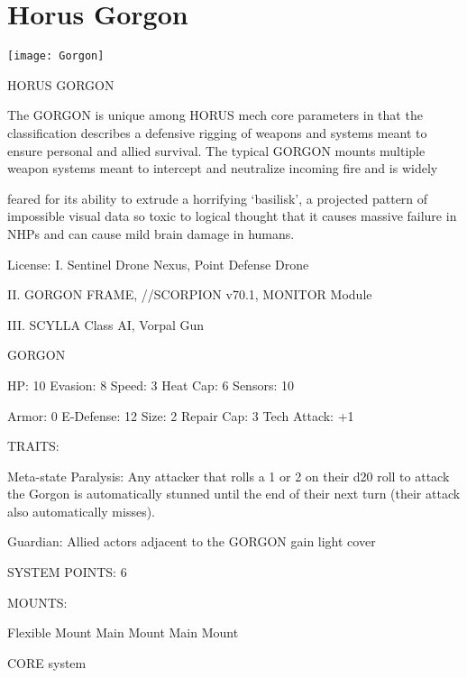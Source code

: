 \section{Horus Gorgon}

\texttt{[image: Gorgon]}

                                              HORUS GORGON

The GORGON is unique among HORUS mech core parameters in that the classification describes a
defensive rigging of weapons and systems meant to ensure personal and allied survival. The typical
GORGON mounts multiple weapon systems meant to intercept and neutralize incoming fire and is widely

feared for its ability to extrude a horrifying ‘basilisk’, a projected pattern of impossible visual data so toxic to
logical thought that it causes massive failure in NHPs and can cause mild brain damage in humans.




                                                   License:
I. Sentinel Drone Nexus, Point Defense Drone

II. GORGON FRAME,  //SCORPION v70.1, MONITOR Module

III. SCYLLA Class AI, Vorpal Gun


                                                 GORGON

 HP: 10         Evasion: 8                            Speed: 3            Heat Cap: 6        Sensors: 10

 Armor: 0       E-Defense: 12                         Size: 2             Repair Cap: 3      Tech Attack:
                                                                                             +1

                                                   TRAITS:

 Meta-state Paralysis: Any attacker that rolls a 1 or 2 on their d20 roll to attack the Gorgon is
 automatically stunned until the end of their next turn (their attack also automatically misses).

 Guardian: Allied actors adjacent to the GORGON gain light cover

                                             SYSTEM POINTS: 6

                                                  MOUNTS:

 Flexible Mount                    Main Mount                             Main Mount

                                                CORE system

